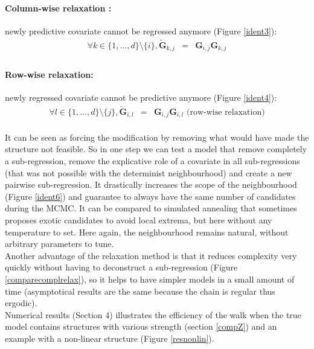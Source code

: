 \documentclass[12pt,a4paper]{report}
\begin{document}
\paragraph{Column-wise relaxation :}		
newly predictive covariate cannot be regressed anymore (Figure \ref{ident3}):
		\begin{eqnarray}
		\forall k \in \{1,\dots,d\}\setminus \{i\}, \tilde{\boldsymbol{G}}_{k,j}&=&\boldsymbol{G}_{i,j}\boldsymbol{G}_{k,j}  \\
				\end{eqnarray}
\paragraph{Row-wise relaxation:} newly regressed covariate cannot be predictive anymore (Figure \ref{ident4}):
		\begin{eqnarray}
		\forall l \in \{1,\dots,d\}\setminus \{j\}, \tilde{\boldsymbol{G}}_{i,l}&=&\boldsymbol{G}_{i,j}\boldsymbol{G}_{i,l} \textrm{ (row-wise relaxation)}
	\end{eqnarray} \\
	
	It can be seen as forcing the modification by removing what would have made the structure not feasible. So in one step we can test a model that remove completely a sub-regression, remove the explicative role of a covariate in all sub-regressions (that was not possible with the determinist neighbourhood) and create a new pairwise sub-regression. It drastically increases the scope of the neighbourhood (Figure \ref{ident6}) and guarantee to always have the same number of candidates during the MCMC. It can be compared to simulated annealing that sometimes proposes exotic candidates to avoid local extrema, but here without any temperature to set. Here again, the neighbourhood remains natural, without arbitrary parameters to tune. \\
	
	Another advantage of the relaxation method is that it reduces complexity very quickly without having to deconstruct a sub-regression (Figure \ref{comparecomplrelax}), so it helps to have simpler models in a small amount of time (asymptotical results are the same because the chain is regular thus ergodic).\\
			
Numerical results (Section 4) illustrates the efficiency of the walk when the true model contains structures with various strength (section \ref{compZ}) and an example with a non-linear structure (Figure \ref{resnonlin}). \\
\end{document}
